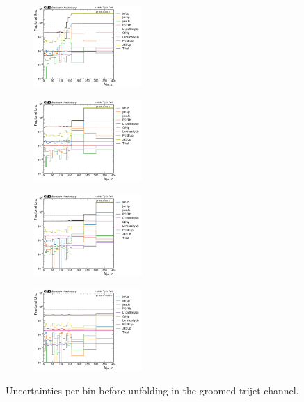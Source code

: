 \begin{figure}[ht!]
  \centering
  \begin{subfigure}
    \centering
    \includegraphics[width=0.45\textwidth]{figures/multijet/trijet/fracUnc_groomed_0.pdf}
\end{subfigure} 
  \begin{subfigure}
    \centering
    \includegraphics[width=0.45\textwidth]{figures/multijet/trijet/fracUnc_groomed_1.pdf}
\end{subfigure}
  \begin{subfigure}
    \centering
    \includegraphics[width=0.45\textwidth]{figures/multijet/trijet/fracUnc_groomed_2.pdf}
\end{subfigure}
  \begin{subfigure}
    \centering
    \includegraphics[width=0.45\textwidth]{figures/multijet/trijet/fracUnc_groomed_3.pdf}
\end{subfigure}
  \caption{Uncertainties per bin before unfolding in the groomed trijet channel.}
  \label{fig:trijetunc_groomed}
  \end{figure}
